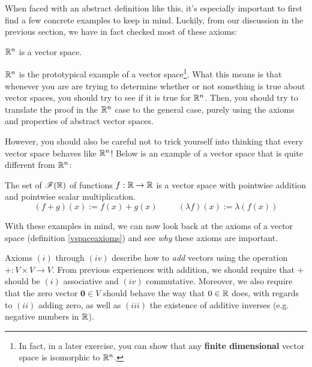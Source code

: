     
When faced with an abstract definition like this, it's especially important to first find a few concrete examples to keep in mind.  Luckily, from our discussion in the previous section, we have in fact checked most of these axioms:
    
    
    \begin{example}
    \vspace{-1em}
    \begin{theorem}
    $\mathbb{R}^n$ is a vector space.
    \end{theorem}
    \end{example}
    
    $\mathbb{R}^n$ is the prototypical example of a vector space\footnote{In fact, in a later exercise, you can show that any \textbf{finite dimensional} vector space is isomorphic to $\mathbb{R}^n$.}.  What this means is that whenever you are are trying to determine whether or not something is true about vector spaces, you should try to see if it is true for $\mathbb{R}^n$.  Then, you should try to translate the proof in the $\mathbb{R}^n$ case to the general case, purely using the axioms and properties of abstract vector spaces.
    
    However, you should also be careful not to trick yourself into thinking that every vector space behaves like $\mathbb{R}^n$!  Below is an example of a vector space that is quite different from $\mathbb{R}^n$: 
    
    \begin{example}
    \vspace{-1em}
    \begin{theorem}\label{functionsvspace}
    The set of $\mathscr{F}(\mathbb{R})$ of functions $f : \mathbb{R} \to \mathbb{R}$ is a vector space with pointwise addition and pointwise scalar multiplication.  $$(f + g)(x) := f(x) + g(x) \ \qquad \ (\lambda f)(x) := \lambda (f(x))$$
    \end{theorem}
    
    \end{example}

    With these examples in mind, we can now look back at the axioms of a vector space (definition \ref{vspaceaxioms}) and see \textit{why} these axioms are important.

    Axioms $(i)$ through $(iv)$ describe how to \textit{add} vectors using the operation $+ : V \times V \to V$.  From previous experiences with addition, we should require that $+$ should be $(i)$ associative and $(iv)$ commutative.  Moreover, we also require that the zero vector $\bm{0} \in V$ should behave the way that $0 \in \mathbb{R}$ does, with regards to $(ii)$ adding zero, as well as $(iii)$ the existence of additive inverses (e.g. negative numbers in $\mathbb{R}$).

